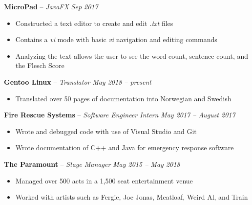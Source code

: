 \documentclass[11pt,letterpaper]{article}
\begin{document}
\headedsection 
{\textbf{MicroPad} -- \textit{JavaFX}}
{\textit{Sep 2017}} {
		\begin{itemize}[noitemsep,nolistsep]
	\item Constructed a text editor to create and edit \textit{.txt} files
	\item Contains a \textit{vi} mode with basic \textit{vi} navigation and editing commands
	\item Analyzing the text allows the user to see the word count, sentence count, and the Flesch Score
\end{itemize}
}


\spacedhrule{0.2em}{-0.8em} 



\headedsection
{\textbf{Gentoo Linux} -- \textit{Translator}}
{\textit{May 2018 -- present}} {
	\begin{itemize}[noitemsep,nolistsep]
		\item Translated over 50 pages of documentation into Norwegian and Swedish
	\end{itemize}
}


\headedsection 
{\textbf{Fire Rescue Systems} -- \textit{Software Engineer Intern}}
{\textit{May 2017 -- August 2017}} {
	\begin{itemize}[noitemsep,nolistsep]
		\item Wrote and debugged code with use of Visual Studio and Git
		\item Wrote documentation of C++ and Java for emergency response software
	\end{itemize}
}


\headedsection 
{\textbf{The Paramount} -- \textit{Stage Manager}}
{\textit{May 2015 -- May 2018}} {
	\begin{itemize}[noitemsep,nolistsep]
		\item Managed over 500 acts in a 1,500 seat entertainment venue
		\item Worked with artists such as Fergie, Joe Jonas, Meatloaf, Weird Al, and Train
	\end{itemize}
}
\end{document}
